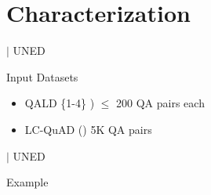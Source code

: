 \documentclass[]{beamer}
\def\mAlertSpace{\vspace{0.5em}}
\newcommand{\mShortTitle}{\secname \hfill {\scriptsize$|$ UNED}}
\begin{document}
\section{Characterization}
  \begin{frame}{\mShortTitle}
    \begin{alertblock}{Input Datasets}
      \begin{itemize}
        \item QALD \{1-4\} \cite{Unger2014}) $\le$ 200 QA pairs each
        \item LC-QuAD (\cite{trivedi2017lc}) 5K QA pairs
      \end{itemize}
    \end{alertblock}
  \end{frame}

  \begin{frame}[fragile]{\mShortTitle}
    \begin{alertblock}{Example}
      
    \end{alertblock}
  \end{frame}
\end{document}
